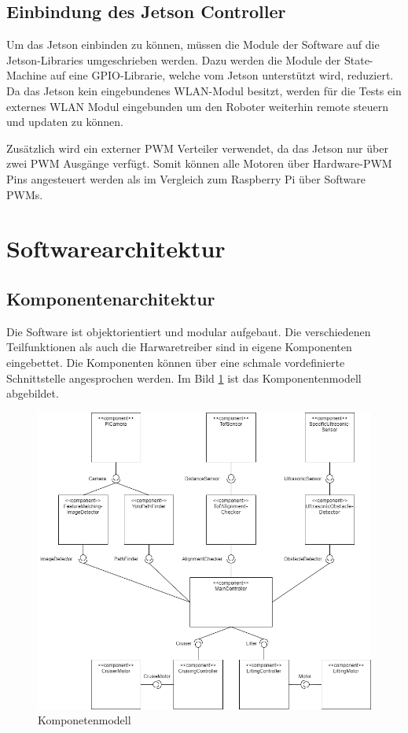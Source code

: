 \subsection{Einbindung des Jetson Controller}

 Um das Jetson einbinden zu können, müssen die Module der Software auf die Jetson-Libraries umgeschrieben werden. Dazu werden die Module der State-Machine auf eine GPIO-Librarie, welche vom Jetson unterstützt wird, reduziert. Da das Jetson kein eingebundenes WLAN-Modul besitzt, werden für die Tests ein externes WLAN Modul eingebunden um den Roboter weiterhin remote steuern und updaten zu können.
 
 Zusätzlich wird ein externer PWM Verteiler verwendet, da das Jetson nur über zwei PWM Ausgänge verfügt. Somit können alle Motoren über Hardware-PWM Pins angesteuert werden als im Vergleich zum Raspberry Pi über Software PWMs. 
 
 \section{Softwarearchitektur}
\subsection{Komponentenarchitektur}
Die Software ist objektorientiert und modular aufgebaut. Die verschiedenen Teilfunktionen als auch die Harwaretreiber sind in eigene Komponenten eingebettet. Die Komponenten können über eine schmale vordefinierte Schnittstelle angesprochen werden. Im Bild \ref{fig:komponentenmodell} ist das Komponentenmodell abgebildet. 

\begin{figure}[H]
  \includegraphics[width=1\textwidth]{img/softwarearchitektur/Softwarearchitektur.png}
  \centering
  \caption{Komponetenmodell}
  \label{fig:komponentenmodell}
\end{figure}

